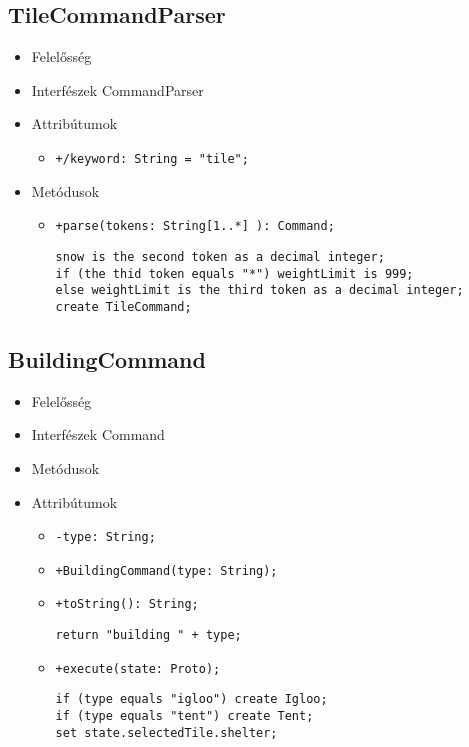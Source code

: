 \subsection{TileCommandParser}
\begin{itemize}
\item Felelősség\newline
\item Interfészek\newline
CommandParser
\item Attribútumok
	\begin{itemize}
		\item \texttt{+/keyword: String = "tile";}
	\end{itemize}
\item Metódusok
\begin{itemize}
		\item \texttt{+parse(tokens: String[1..*] ): Command;}
		\begin{lstlisting}
snow is the second token as a decimal integer;
if (the thid token equals "*") weightLimit is 999;
else weightLimit is the third token as a decimal integer;
create TileCommand;
		\end{lstlisting}
	\end{itemize}
\end{itemize}

\subsection{BuildingCommand}
\begin{itemize}
\item Felelősség\newline
\item Interfészek\newline
Command
\item Metódusok
\item Attribútumok
	\begin{itemize}
		\item \texttt{-type: String;}
	\end{itemize}
\begin{itemize}
		\item \texttt{+BuildingCommand(type: String);}
		\item \texttt{+toString(): String;}
		\begin{lstlisting}
return "building " + type;
		\end{lstlisting}
		\item \texttt{+execute(state: Proto);}
		\begin{lstlisting}
if (type equals "igloo") create Igloo;
if (type equals "tent") create Tent;
set state.selectedTile.shelter;
		\end{lstlisting}
	\end{itemize}
\end{itemize}
